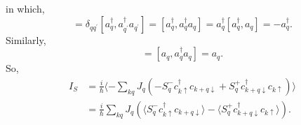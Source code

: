 \documentclass[11pt,a4paper]{book}
\begin{document}
in which,
\begin{equation}
[a_{q}^{\dag}, \sum_{q^{\prime}} a_{q'}^{\dagger}, a_{q^{\prime}}] = \delta_{q q^{\prime}}[a_{q}^{\dagger}, a_{q^{\prime}}^{\dagger} a_{q^{\prime}}] = [a_{q}^{\dagger}, a_{q}^{\dagger} a_{q}] = a_{q}^{\dagger}[a_{q}^{\dagger}, a_{q}] = - a_{q}^{\dagger}.
\end{equation}
Similarly,
\begin{equation}
[a_{q}, \sum_{q^{\prime}} a_{q^{\prime}}^{+} a_{q^{\prime}}]=[a_{q}, a_{q}^{\dagger} a_{q}]=a_{q}.
\label{eq:1-1}
\end{equation}
So,
\begin{equation}
\begin{split}
I_{S}&=\frac{i}{\hbar}\langle -\sum_{k q} J_{q}\left(-S_{q}^{-} c_{k \uparrow}^{\dagger} c_{k+q\downarrow} + S_{q}^{+} c_{k+q\downarrow}^{\dagger} c_{k \uparrow}\right) \rangle \\
&= \frac{i}{\hbar} \sum_{k q} J_{q}\left( \langle S_{q}^{-} c_{k \uparrow}^{\dagger} c_{k+q\downarrow}\rangle - \langle S_{q}^{+} c_{k+q\downarrow}^{\dagger} c_{k \uparrow}\rangle \right).
\end{split}
\end{equation}
\end{document}
